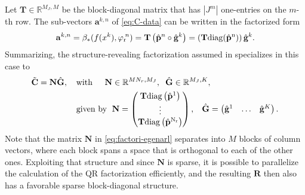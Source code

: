 \documentclass[onefignum,onetabnum]{siamart251104}
\newcommand{\bv}[1]{{\mathbf #1}}
\newcommand{\bt}[1]{{\mathbf{#1}}}
\newcommand{\rom}[1]{{{#1}_{\rm{r}}}}
\newcommand{\Nr}{{N_r}}
\newcommand{\R}{\mathbb{R}}
\newcommand{\tL}{{\fs{\varphi}}}
\newcommand{\tAlg}{{\bv{p}}}
\newcommand{\fs}[1]{{{#1}}} %
\newcommand{\vAp}{\bv{a}}
\newcommand{\Cp}{{\bt{C}}}
\newcommand{\mydiag}{\rm{diag}}
\begin{document}
Let $\bt{T} \in \R^{M_J, M}$ be the block-diagonal matrix that has $|J^m|$ one-entries on the $m$-th row. The sub-vectors $\vAp^{k,n}$ of \eqref{eq:C-data} can be written in the factorized form
\begin{align*}
	\vAp^{k,n} = \beta_{\rm{*}}(f(x^k), \rom{\tL}\!^n) = \bt{T} \left( \hat{\bv{p}}^{n} \circ  \hat{\bv{g}}^{k} \right) =  \left( \bt{T} \mydiag(\hat{\bv{p}}^{n}) \right) \hat{\bv{g}}^{k}.
\end{align*}
Summarizing, the structure-revealing factorization assumed in  specializes in this case to
{\small
\begin{align}
\begin{split} \label{eq:factori-egenarl}
\tilde{\Cp} = {\bt{N}} \hat{\bt{G}}, 
\hspace{0.4cm} & \text{with } \hspace{0.4cm}  {\bt{N}} \in \R^{M \Nr,M_J}, \hspace{0.2cm}  \hat{\bt{G}} \in \R^{M_J,K},\\
& \text{given by }\hspace{0.1cm}  {\bt{N}} = 
\begin{pmatrix}
	\bt{T} \mydiag\left(\hat\tAlg^1\right) \\
	\vdots \\
	\bt{T} \mydiag\left(\hat\tAlg^{\Nr}\right)
\end{pmatrix}, \hspace{0.3cm}
\hat{\bt{G}} = 
\begin{pmatrix}
\hat{\bv{g}}^1 & \ldots & \hat{\bv{g}}^K  
\end{pmatrix} .
\end{split}
\end{align}
}%
Note that the matrix ${\bt{N}}$ in \eqref{eq:factori-egenarl} separates into $M$ blocks of column vectors, where each block spans a space that is orthogonal to each of the other ones. Exploiting that structure and since $\bt{N}$ is sparse, it is possible to parallelize the calculation of the QR factorization efficiently, and the resulting $\bt{R}$ then also has a favorable sparse block-diagonal structure.
\end{document}
